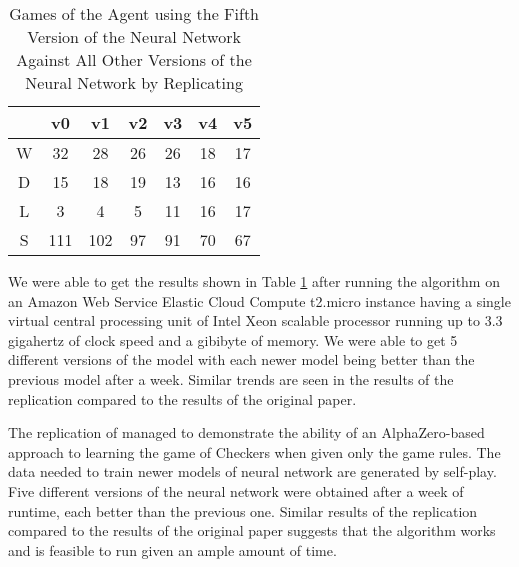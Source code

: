 \documentclass{article}
\begin{document}
\begin{table}[htb]
    \centering
    \begin{tabular}{c|cccccc}
        & v0 & v1 & v2 & v3 & v4 & v5 \\ \hline
        W & 32 & 28 & 26 & 26 & 18 & 17 \\
        D & 15 & 18 & 19 & 13 & 16 & 16 \\
        L & 3 & 4 & 5 & 11 & 16 & 17 \\ \hline
        S & 111 & 102 & 97 & 91 & 70 & 67
    \end{tabular}
    \caption{Games of the Agent using the Fifth Version of the Neural Network Against All Other Versions of the Neural Network by Replicating \cite{Popic_Boskovic_Brest_2021}}
    \label{tab:replication-results}
\end{table}

We were able to get the results shown in Table \ref{tab:replication-results} after running the algorithm on an Amazon Web Service Elastic Cloud Compute t2.micro instance having a single virtual central processing unit of Intel Xeon scalable processor running up to 3.3 gigahertz of clock speed and a gibibyte of memory. We were able to get 5 different versions of the model with each newer model being better than the previous model after a week. Similar trends are seen in the results of the replication compared to the results of the original paper.

The replication of \cite{Popic_Boskovic_Brest_2021} managed to demonstrate the ability of an AlphaZero-based approach to learning the game of Checkers when given only the game rules. The data needed to train newer models of neural network are generated by self-play. Five different versions of the neural network were obtained after a week of runtime, each better than the previous one. Similar results of the replication compared to the results of the original paper suggests that the algorithm works and is feasible to run given an ample amount of time.



\end{document}
